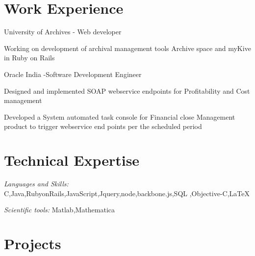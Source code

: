 \documentclass[letterpaper,10pt]{article}
\begin{document}
\section{Work Experience}
\begin{reslist}
	\item { University of Archives - Web developer     \date{Present }}
	\begin{reslist}
		\item {Working on development of archival management tools Archive space and myKive  in Ruby on Rails}
	\end{reslist}

	\item { Oracle India -Software Development Engineer \date{July 2010 to July 2012}}
	\begin{reslist}
		\item {Designed and implemented SOAP webservice endpoints for Profitability and Cost management}
		\item {Developed a System automated task console for Financial close Management product to trigger webservice end points per the scheduled period }
	\end{reslist}
\end{reslist}
\section{Technical Expertise}
\begin{resdescription}
	\item[] { {\em Languages and Skills:}  C,Java,RubyonRails,JavaScript,Jquery,node,backbone.js,SQL ,Objective-C,\LaTeX}
	\item[]{ {\em Scientific tools:} Matlab,Mathematica}
\end{resdescription}


\section{Projects}
\end{document}
